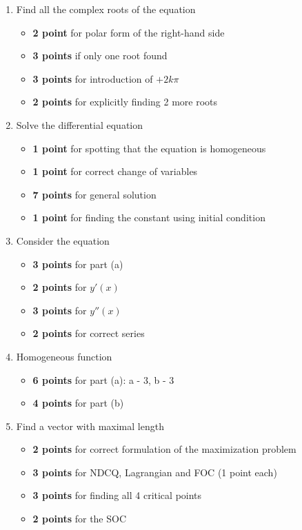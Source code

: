 \begin{enumerate}
\item Find all the complex roots of the equation
\begin{itemize}
    \item \textbf{2 point} for polar form of the right-hand side
    \item \textbf{3 points} if only one root found
    \item \textbf{3 points} for introduction of $+2k\pi$
    \item \textbf{2 points} for explicitly finding 2 more roots
\end{itemize}

\item Solve the differential equation
\begin{itemize}
    \item \textbf{1 point} for spotting that the equation is homogeneous
    \item \textbf{1 point} for correct change of variables
    \item \textbf{7 points} for general solution
    \item \textbf{1 point} for finding the constant using initial condition
\end{itemize}

\item Consider the equation
\begin{itemize}
    \item \textbf{3 points} for part (a)
    \item \textbf{2 points} for $y'(x)$
    \item \textbf{3 points} for $y''(x)$
    \item \textbf{2 points} for correct series
\end{itemize}

\item Homogeneous function
\begin{itemize}
    \item \textbf{6 points} for part (a): a - 3, b - 3
    \item \textbf{4 points} for part (b)
\end{itemize}

\item Find a vector with maximal length
\begin{itemize}
    \item \textbf{2 points} for correct formulation of the maximization problem
    \item \textbf{3 points} for NDCQ, Lagrangian and FOC (1 point each)
    \item \textbf{3 points} for finding all 4 critical points
    \item \textbf{2 points} for the SOC
\end{itemize}


\end{enumerate}
